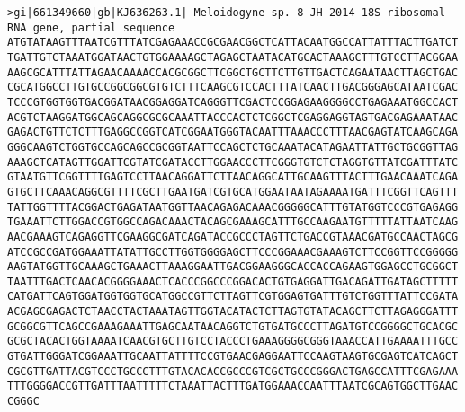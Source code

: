\documentclass[11pt]{article}
\begin{document}
\begin{Verbatim}[commandchars=\\\{\}]
>gi|661349660|gb|KJ636263.1| Meloidogyne sp. 8 JH-2014 18S ribosomal RNA gene, partial sequence
ATGTATAAGTTTAATCGTTTATCGAGAAACCGCGAACGGCTCATTACAATGGCCATTATTTACTTGATCT
TGATTGTCTAAATGGATAACTGTGGAAAAGCTAGAGCTAATACATGCACTAAAGCTTTGTCCTTACGGAA
AAGCGCATTTATTAGAACAAAACCACGCGGCTTCGGCTGCTTCTTGTTGACTCAGAATAACTTAGCTGAC
CGCATGGCCTTGTGCCGGCGGCGTGTCTTTCAAGCGTCCACTTTATCAACTTGACGGGAGCATAATCGAC
TCCCGTGGTGGTGACGGATAACGGAGGATCAGGGTTCGACTCCGGAGAAGGGGCCTGAGAAATGGCCACT
ACGTCTAAGGATGGCAGCAGGCGCGCAAATTACCCACTCTCGGCTCGAGGAGGTAGTGACGAGAAATAAC
GAGACTGTTCTCTTTGAGGCCGGTCATCGGAATGGGTACAATTTAAACCCTTTAACGAGTATCAAGCAGA
GGGCAAGTCTGGTGCCAGCAGCCGCGGTAATTCCAGCTCTGCAAATACATAGAATTATTGCTGCGGTTAG
AAAGCTCATAGTTGGATTCGTATCGATACCTTGGAACCCTTCGGGTGTCTCTAGGTGTTATCGATTTATC
GTAATGTTCGGTTTTGAGTCCTTAACAGGATTCTTAACAGGCATTGCAAGTTTACTTTGAACAAATCAGA
GTGCTTCAAACAGGCGTTTTCGCTTGAATGATCGTGCATGGAATAATAGAAAATGATTTCGGTTCAGTTT
TATTGGTTTTACGGACTGAGATAATGGTTAACAGAGACAAACGGGGGCATTTGTATGGTCCCGTGAGAGG
TGAAATTCTTGGACCGTGGCCAGACAAACTACAGCGAAAGCATTTGCCAAGAATGTTTTTATTAATCAAG
AACGAAAGTCAGAGGTTCGAAGGCGATCAGATACCGCCCTAGTTCTGACCGTAAACGATGCCAACTAGCG
ATCCGCCGATGGAAATTATATTGCCTTGGTGGGGAGCTTCCCGGAAACGAAAGTCTTCCGGTTCCGGGGG
AAGTATGGTTGCAAAGCTGAAACTTAAAGGAATTGACGGAAGGGCACCACCAGAAGTGGAGCCTGCGGCT
TAATTTGACTCAACACGGGGAAACTCACCCGGCCCGGACACTGTGAGGATTGACAGATTGATAGCTTTTT
CATGATTCAGTGGATGGTGGTGCATGGCCGTTCTTAGTTCGTGGAGTGATTTGTCTGGTTTATTCCGATA
ACGAGCGAGACTCTAACCTACTAAATAGTTGGTACATACTCTTAGTGTATACAGCTTCTTAGAGGGATTT
GCGGCGTTCAGCCGAAAGAAATTGAGCAATAACAGGTCTGTGATGCCCTTAGATGTCCGGGGCTGCACGC
GCGCTACACTGGTAAAATCAACGTGCTTGTCCTACCCTGAAAGGGGCGGGTAAACCATTGAAAATTTGCC
GTGATTGGGATCGGAAATTGCAATTATTTTCCGTGAACGAGGAATTCCAAGTAAGTGCGAGTCATCAGCT
CGCGTTGATTACGTCCCTGCCCTTTGTACACACCGCCCGTCGCTGCCCGGGACTGAGCCATTTCGAGAAA
TTTGGGGACCGTTGATTTAATTTTTCTAAATTACTTTGATGGAAACCAATTTAATCGCAGTGGCTTGAAC
CGGGC


\end{Verbatim}
\end{document}
